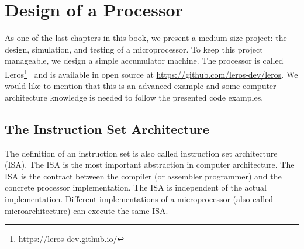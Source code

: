 \documentclass[%
    10pt,
    headinclude, footexclude,
    openright, %
    notitlepage,
    cleardoubleempty,
    headsepline,
    pointlessnumbers,
    bibtotoc, idxtotoc,
    ]{scrbook}
\newcommand{\myref}[2]{\href{#1}{#2}}
\renewcommand{\myref}[2]{{#2}{\footnote{\url{#1}}}}
\begin{document}
\chapter{Design of a Processor}


As one of the last chapters in this book, we present a medium size project:
the design, simulation, and testing of a microprocessor.
To keep this project manageable, we design a simple accumulator machine.
The processor is called \myref{https://leros-dev.github.io/}{Leros}~\cite{leros:arcs2019}
and is available in open source at \url{https://github.com/leros-dev/leros}.
We would like to mention that this is an advanced example and some computer
architecture knowledge is needed to follow the presented code examples.

\section{The Instruction Set Architecture}

The definition of an instruction set is also called instruction set architecture (ISA).
The ISA is the most important abstraction in computer architecture.
The ISA is the contract between the compiler (or assembler programmer) and the
concrete processor implementation.
The ISA is independent of the actual implementation.
Different implementations of a microprocessor (also called microarchitecture)
can execute the same ISA.
\end{document}
